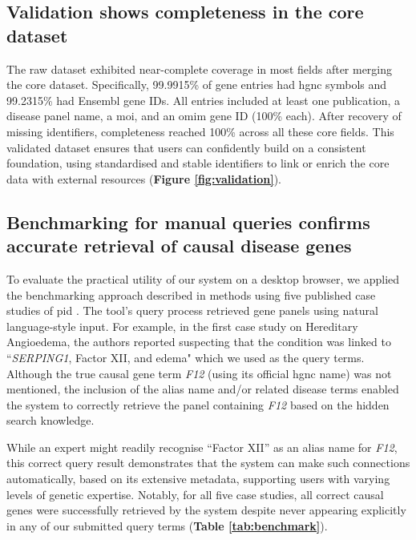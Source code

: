 \subsection{Validation shows completeness in the core dataset}
\noindent
The raw dataset exhibited near-complete coverage in most fields after merging the core dataset. 
Specifically, 99.9915\% of gene entries had \ac{hgnc} symbols %
and 99.2315\% had Ensembl gene IDs. %
All entries included at least one publication, a disease panel name, a \ac{moi}, and an \ac{omim} gene ID (100\% each). 
After recovery of missing identifiers, completeness reached 100\% across all these core fields.
This validated dataset ensures that users can confidently build on a consistent foundation, using standardised and stable identifiers to link or enrich the core data with external resources (\textbf{Figure \ref{fig:validation}}).


\subsection{Benchmarking for manual queries confirms accurate retrieval of causal disease genes}
\noindent
To evaluate the practical utility of our system on a desktop browser, we applied the benchmarking approach described in methods using five published case studies of \ac{pid}
\cite{arruda_genetic_2015, 
mcaleer_severe_2015,
verhoeven_hematopoietic_2022,
magerus-chatinet_autoimmune_2013,
sharfe_fatal_2014}. %
The tool's query process retrieved gene panels using natural language-style input. 
For example, in the first case study on Hereditary Angioedema, the authors reported suspecting that the condition was linked to ``\textit{SERPING1}, Factor XII, and edema" which we used as the query terms. 
Although the true causal gene term \textit{F12} (using its official \ac{hgnc} name) was not mentioned, the inclusion of the alias name and/or related disease terms enabled the system to correctly retrieve the panel containing \textit{F12} based on the hidden search knowledge.

While an expert might readily recognise ``Factor XII'' as an alias name for \textit{F12}, this correct query result demonstrates that the system can make such connections automatically, based on its extensive metadata, supporting users with varying levels of genetic expertise.
Notably, for all five case studies, all correct causal genes were successfully retrieved by the system despite never appearing explicitly in any of our submitted query terms (\textbf{Table \ref{tab:benchmark}}).

